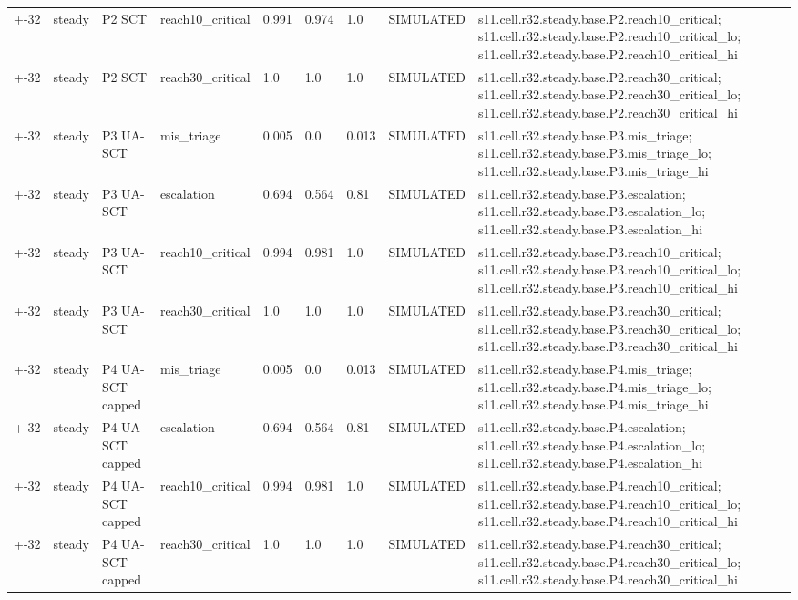 \begin{table}[t]
\begin{tabular}{lllllllll}
+-32 & steady & P2 SCT & reach10\_critical & 0.991 & 0.974 & 1.0 & SIMULATED & s11.cell.r32.steady.base.P2.reach10\_critical; s11.cell.r32.steady.base.P2.reach10\_critical\_lo; s11.cell.r32.steady.base.P2.reach10\_critical\_hi \\
+-32 & steady & P2 SCT & reach30\_critical & 1.0 & 1.0 & 1.0 & SIMULATED & s11.cell.r32.steady.base.P2.reach30\_critical; s11.cell.r32.steady.base.P2.reach30\_critical\_lo; s11.cell.r32.steady.base.P2.reach30\_critical\_hi \\
+-32 & steady & P3 UA-SCT & mis\_triage & 0.005 & 0.0 & 0.013 & SIMULATED & s11.cell.r32.steady.base.P3.mis\_triage; s11.cell.r32.steady.base.P3.mis\_triage\_lo; s11.cell.r32.steady.base.P3.mis\_triage\_hi \\
+-32 & steady & P3 UA-SCT & escalation & 0.694 & 0.564 & 0.81 & SIMULATED & s11.cell.r32.steady.base.P3.escalation; s11.cell.r32.steady.base.P3.escalation\_lo; s11.cell.r32.steady.base.P3.escalation\_hi \\
+-32 & steady & P3 UA-SCT & reach10\_critical & 0.994 & 0.981 & 1.0 & SIMULATED & s11.cell.r32.steady.base.P3.reach10\_critical; s11.cell.r32.steady.base.P3.reach10\_critical\_lo; s11.cell.r32.steady.base.P3.reach10\_critical\_hi \\
+-32 & steady & P3 UA-SCT & reach30\_critical & 1.0 & 1.0 & 1.0 & SIMULATED & s11.cell.r32.steady.base.P3.reach30\_critical; s11.cell.r32.steady.base.P3.reach30\_critical\_lo; s11.cell.r32.steady.base.P3.reach30\_critical\_hi \\
+-32 & steady & P4 UA-SCT capped & mis\_triage & 0.005 & 0.0 & 0.013 & SIMULATED & s11.cell.r32.steady.base.P4.mis\_triage; s11.cell.r32.steady.base.P4.mis\_triage\_lo; s11.cell.r32.steady.base.P4.mis\_triage\_hi \\
+-32 & steady & P4 UA-SCT capped & escalation & 0.694 & 0.564 & 0.81 & SIMULATED & s11.cell.r32.steady.base.P4.escalation; s11.cell.r32.steady.base.P4.escalation\_lo; s11.cell.r32.steady.base.P4.escalation\_hi \\
+-32 & steady & P4 UA-SCT capped & reach10\_critical & 0.994 & 0.981 & 1.0 & SIMULATED & s11.cell.r32.steady.base.P4.reach10\_critical; s11.cell.r32.steady.base.P4.reach10\_critical\_lo; s11.cell.r32.steady.base.P4.reach10\_critical\_hi \\
+-32 & steady & P4 UA-SCT capped & reach30\_critical & 1.0 & 1.0 & 1.0 & SIMULATED & s11.cell.r32.steady.base.P4.reach30\_critical; s11.cell.r32.steady.base.P4.reach30\_critical\_lo; s11.cell.r32.steady.base.P4.reach30\_critical\_hi \\

\end{tabular}
\end{table}
